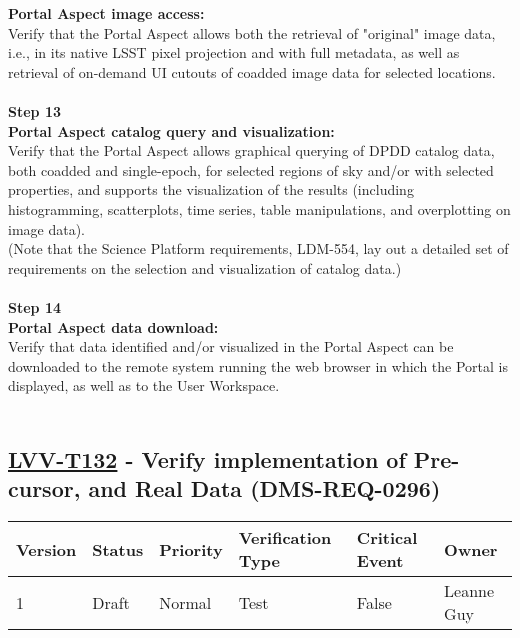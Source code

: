 \textbf{Portal Aspect image access:}\\
Verify that the Portal Aspect allows both the retrieval of "original"
image data, i.e., in its native LSST pixel projection and with full
metadata, as well as retrieval of on-demand UI cutouts of coadded image
data for selected locations.\\
~\\
\textbf{Step 13}\\
\textbf{Portal Aspect catalog query and visualization:}\\
Verify that the Portal Aspect allows graphical querying of DPDD catalog
data, both coadded and single-epoch, for selected regions of sky and/or
with selected properties, and supports the visualization of the results
(including histogramming, scatterplots, time series, table
manipulations, and overplotting on image data).\\
(Note that the Science Platform requirements, LDM-554, lay out a
detailed set of requirements on the selection and visualization of
catalog data.)\\
~\\
\textbf{Step 14}\\
\textbf{Portal Aspect data download:}\\
Verify that data identified and/or visualized in the Portal Aspect can
be downloaded to the remote system running the web browser in which the
Portal is displayed, as well as to the User Workspace.\\
~\\

\hypertarget{lvv-t132---verify-implementation-of-pre-cursor-and-real-data-dms-req-0296}{%
\subsection{\texorpdfstring{\href{https://jira.lsstcorp.org/secure/Tests.jspa\#/testCase/LVV-T132}{LVV-T132}
- Verify implementation of Pre-cursor, and Real Data
(DMS-REQ-0296)}{LVV-T132 - Verify implementation of Pre-cursor, and Real Data (DMS-REQ-0296)}}\label{lvv-t132---verify-implementation-of-pre-cursor-and-real-data-dms-req-0296}}

\begin{longtable}[]{@{}llllll@{}}
\toprule
Version & Status & Priority & Verification Type & Critical Event &
Owner\tabularnewline
\midrule
\endhead
1 & Draft & Normal & Test & False & Leanne Guy\tabularnewline
\bottomrule
\end{longtable}

